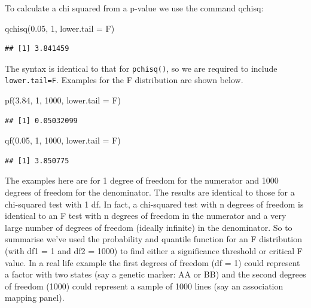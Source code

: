\documentclass[
]{book}
\newenvironment{Shaded}{\begin{snugshade}}{\end{snugshade}}
\newcommand{\AttributeTok}[1]{\textcolor[rgb]{0.77,0.63,0.00}{#1}}
\newcommand{\DecValTok}[1]{\textcolor[rgb]{0.00,0.00,0.81}{#1}}
\newcommand{\FloatTok}[1]{\textcolor[rgb]{0.00,0.00,0.81}{#1}}
\newcommand{\FunctionTok}[1]{\textcolor[rgb]{0.00,0.00,0.00}{#1}}
\newcommand{\NormalTok}[1]{#1}
\begin{document}
To calculate a chi squared from a p-value we use the command qchisq:

\begin{Shaded}
\begin{Highlighting}[]
\FunctionTok{qchisq}\NormalTok{(}\FloatTok{0.05}\NormalTok{, }\DecValTok{1}\NormalTok{, }\AttributeTok{lower.tail =}\NormalTok{ F)}
\end{Highlighting}
\end{Shaded}

\begin{verbatim}
## [1] 3.841459
\end{verbatim}

The syntax is identical to that for \texttt{pchisq()}, so we are required to include \texttt{lower.tail=F}.
Examples for the F distribution are shown below.

\begin{Shaded}
\begin{Highlighting}[]
\FunctionTok{pf}\NormalTok{(}\FloatTok{3.84}\NormalTok{, }\DecValTok{1}\NormalTok{, }\DecValTok{1000}\NormalTok{, }\AttributeTok{lower.tail =}\NormalTok{ F)}
\end{Highlighting}
\end{Shaded}

\begin{verbatim}
## [1] 0.05032099
\end{verbatim}

\begin{Shaded}
\begin{Highlighting}[]
\FunctionTok{qf}\NormalTok{(}\FloatTok{0.05}\NormalTok{, }\DecValTok{1}\NormalTok{, }\DecValTok{1000}\NormalTok{, }\AttributeTok{lower.tail =}\NormalTok{ F)}
\end{Highlighting}
\end{Shaded}

\begin{verbatim}
## [1] 3.850775
\end{verbatim}

The examples here are for 1 degree of freedom for the numerator and 1000 degrees of freedom for the denominator. The results are identical to those for a chi-squared test with 1 df. In fact, a chi-squared test with n degrees of freedom is identical to an F test with n degrees of freedom in the numerator and a very large number of degrees of freedom (ideally infinite) in the denominator. So to summarise we've used the probability and quantile function for an F distribution (with df1 = 1 and df2 = 1000) to find either a significance threshold or critical F value. In a real life example the first degrees of freedom (df = 1) could represent a factor with two states (say a genetic marker: AA or BB) and the second degrees of freedom (1000) could represent a sample of 1000 lines (say an association mapping panel).
\end{document}
